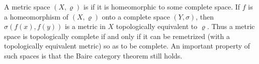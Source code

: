 A metric space $(X, \varrho)$ is  if it is homeomorphic to some complete space. If $f$ is a homeomorphism of $(X, \varrho)$ onto a complete space $(Y, \sigma)$, then $\sigma(f(x), f(y))$ is a metric in $X$ topologically equivalent to $\varrho$. Thus a metric space is topologically complete if and only if it can be remetrized (with a topologically equivalent metric) so as to be complete. An important property of such spaces is that the Baire category theorem still holds.
